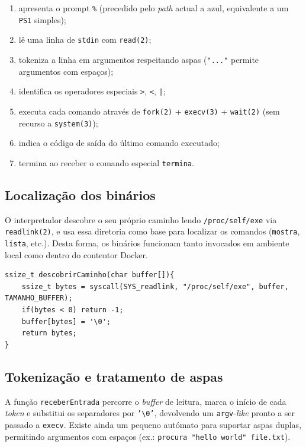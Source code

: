 \documentclass[11pt,a4paper]{article}
\begin{document}
\begin{enumerate}[leftmargin=2em]
    \item apresenta o prompt \texttt{\%} (precedido pelo \textit{path} actual a azul, equivalente a um \texttt{PS1} simples);
    \item lê uma linha de \texttt{stdin} com \texttt{read(2)};
    \item tokeniza a linha em argumentos respeitando aspas (\texttt{"..."} permite argumentos com espaços);
    \item identifica os operadores especiais \texttt{>}, \texttt{<}, \texttt{|};
    \item executa cada comando através de \texttt{fork(2)} + \texttt{execv(3)} + \texttt{wait(2)} (sem recurso a \texttt{system(3)});
    \item indica o código de saída do último comando executado;
    \item termina ao receber o comando especial \texttt{termina}.
\end{enumerate}

\subsection{Localização dos binários}

O interpretador descobre o seu próprio caminho lendo \texttt{/proc/self/exe} via \texttt{readlink(2)}, e usa essa diretoria como base para localizar os comandos (\texttt{mostra}, \texttt{lista}, etc.). Desta forma, os binários funcionam tanto invocados em ambiente local como dentro do contentor Docker.

\begin{lstlisting}[style=cstyle,caption={Resolução do caminho dos binários}]
ssize_t descobrirCaminho(char buffer[]){
    ssize_t bytes = syscall(SYS_readlink, "/proc/self/exe", buffer, TAMANHO_BUFFER);
    if(bytes < 0) return -1;
    buffer[bytes] = '\0';
    return bytes;
}
\end{lstlisting}

\subsection{Tokenização e tratamento de aspas}

A função \texttt{receberEntrada} percorre o \textit{buffer} de leitura, marca o início de cada \textit{token} e substitui os separadores por \texttt{'\textbackslash 0'}, devolvendo um \texttt{argv}-\textit{like} pronto a ser passado a \texttt{execv}. Existe ainda um pequeno autómato para suportar aspas duplas, permitindo argumentos com espaços (ex.: \texttt{procura "hello world" file.txt}).
\end{document}
